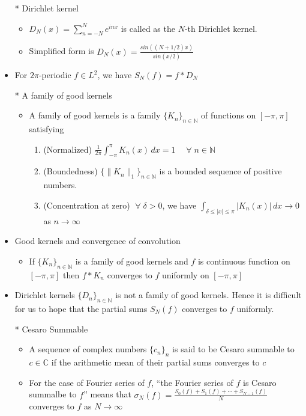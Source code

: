 \documentclass[12pt]{article}
\newcommand{\N}{\mathbb{N}}
\newcommand{\forany}{\; \forall \;}
\begin{document}
\begin{itemize}
    \item[*] Dirichlet kernel 
    \begin{itemize}
        \item $D_N(x)=\sum_{n=-N}^N e^{inx}$ is called as the $N$-th Dirichlet kernel. 
        \item Simplified form is $D_N(x)=\frac{sin((N+1/2)x)}{sin(x/2)}$
    \end{itemize}
    \item For $2\pi$-periodic $f\in L^2$, we have $S_N(f)=f*D_N$
    \item[*] A family of good kernels
    \begin{itemize}
        \item A family of good kernels is a family $\{K_n\}_{n\in \N}$ of functions on $[-\pi, \pi]$ satisfying \begin{enumerate}
            \item (Normalized) $\frac{1}{2\pi}\int_{-\pi}^\pi K_n(x)\,dx=1 \quad \forany n\in \N$
            \item (Boundedness) $\{\|K_n\|_1\}_{n\in \N}$ is a bounded sequence of positive numbers.
            \item (Concentration at zero) $\forany \delta>0$, we have $\int_{\delta\leq |x|\leq \pi} |K_n(x)|\, dx\rightarrow 0$ as $n\rightarrow \infty$
        \end{enumerate}
    \end{itemize}
    \item Good kernels and convergence of convolution
    \begin{itemize}
        \item If $\{K_n\}_{n\in \N}$ is a family of good kernels and $f$ is continuous function on $[-\pi, \pi]$ then $f*K_n$ converges to $f$ uniformly on $[-\pi, \pi]$
    \end{itemize}
    \item Dirichlet kernels $\{D_n\}_{n\in\N}$ is not a family of good kernels. Hence it is difficult for us to hope that the partial sums $S_N(f)$ converges to $f$ uniformly.
    \item[*] Cesaro Summable 
    \begin{itemize}
        \item A sequence of complex numbers $\{c_n\}_n$ is said to be Cesaro summable to $c\in \mathbb{C}$ if the arithmetic mean of their partial sums converges to $c$
        \item For the case of Fourier series of $f$, ``the Fourier series of $f$ is Cesaro summalbe to $f$'' means that $\sigma_N(f)=\frac{S_0(f)+S_1(f)+\cdots+S_{N-1}(f)}{N}$ converges to $f$ as $N\rightarrow \infty$  

\end{itemize}
\end{itemize}
\end{document}
